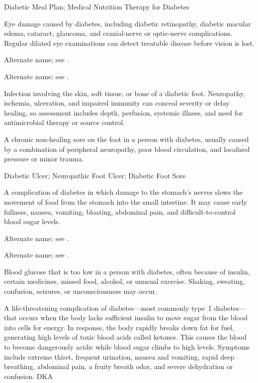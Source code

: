 \synonyms
Diabetic Meal Plan; Medical Nutrition Therapy for Diabetes

 Eye damage caused by diabetes, including diabetic retinopathy, diabetic macular edema, cataract, glaucoma, and cranial-nerve or optic-nerve complications. Regular dilated eye examinations can detect treatable disease before vision is lost.

 Alternate name; see .

 Alternate name; see .

 Infection involving the skin, soft tissue, or bone of a diabetic foot. Neuropathy, ischemia, ulceration, and impaired immunity can conceal severity or delay healing, so assessment includes depth, perfusion, systemic illness, and need for antimicrobial therapy or source control.

 A chronic non-healing sore on the foot in a person with diabetes, usually caused by a combination of peripheral neuropathy, poor blood circulation, and localized pressure or minor trauma.

\synonyms
Diabetic Ulcer; Neuropathic Foot Ulcer; Diabetic Foot Sore

 A complication of diabetes in which damage to the stomach's nerves slows the movement of food from the stomach into the small intestine. It may cause early fullness, nausea, vomiting, bloating, abdominal pain, and difficult-to-control blood sugar levels.

 Alternate name; see .

 Alternate name; see .

 Blood glucose that is too low in a person with diabetes, often because of insulin, certain medicines, missed food, alcohol, or unusual exercise. Shaking, sweating, confusion, seizures, or unconsciousness may occur.

 A life-threatening complication of diabetes---most commonly type~1 diabetes---that occurs when the body lacks sufficient insulin to move sugar from the blood into cells for energy. In response, the body rapidly breaks down fat for fuel, generating high levels of toxic blood acids called ketones. This causes the blood to become dangerously acidic while blood sugar climbs to high levels. Symptoms include extreme thirst, frequent urination, nausea and vomiting, rapid deep breathing, abdominal pain, a fruity breath odor, and severe dehydration or confusion.
\synonyms
DKA

